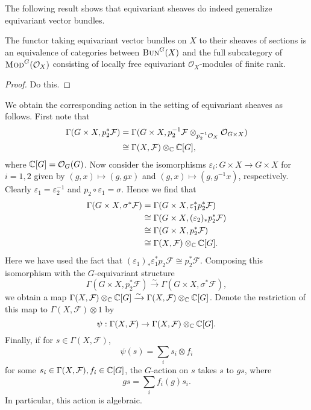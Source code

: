 The following result shows that equivariant sheaves do indeed generalize equivariant vector bundles.

\begin{proposition}
    The functor taking equivariant vector bundles on $X$ to their sheaves of sections
    is an equivalence of categories between $\textsc{Bun}^G(X)$ and the full subcategory of
    $\textsc{Mod}^G(\mathcal{O}_X)$ consisting of locally free equivariant $\mathcal{O}_X$-modules
    of finite rank.
\end{proposition}
\begin{proof}
    Do this.
\end{proof}

We obtain the corresponding action in the setting of equivariant sheaves as follows. First
note that
\begin{align*}
    \Gamma(G\times X,p_2^*\mathcal{F}) &= \Gamma(G\times X, p_2^{-1}\mathcal{F}\otimes_{p_2^{-1}\mathcal{O}_X}\mathcal{O}_{G\times X})\\
    &\cong \Gamma(X,\mathcal{F}) \otimes_{\mathbb{C}}\mathbb{C}[G],
\end{align*}
where $\mathbb{C}[G]=\mathcal{O}_G(G)$. Now consider the isomorphisms
$\varepsilon_i:G\times X\to G\times X$ for $i=1,2$ given by $(g,x)\mapsto (g,gx)$ and $(g,x)\mapsto(g,g^{-1}x)$, respectively.
Clearly $\varepsilon_1=\varepsilon_2^{-1}$ and $p_2\circ\varepsilon_1=\sigma$. Hence we find that
\begin{align*}
    \Gamma(G\times X,\sigma^*\mathcal{F}) &= \Gamma(G\times X,\varepsilon_1^*p_2^*\mathcal{F})\\
    &\cong \Gamma(G\times X,(\varepsilon_2)_*p_2^*\mathcal{F})\\
    &\cong \Gamma(G\times X,p_2^*\mathcal{F})\\
    &\cong \Gamma(X,\mathcal{F}) \otimes_{\mathbb{C}}\mathbb{C}[G].
\end{align*}
Here we have used the fact that $(\varepsilon_1)_*\varepsilon_1^*p_2\mathcal{F}\cong p_2^*\mathcal{F}$.
Composing this isomorphism with the $G$-equivariant structure
\[\Gamma(G\times X,p_2^*\mathcal{F})\xrightarrow{\sim}\Gamma(G\times X,\sigma^*\mathcal{F}),\]
we obtain a map $\Gamma(X,\mathcal{F})\otimes_{\mathbb{C}}\mathbb{C}[G]\xrightarrow{\sim}\Gamma(X,\mathcal{F})\otimes_{\mathbb{C}}\mathbb{C}[G]$.
Denote the restriction of this map to $\Gamma(X,\mathcal{F})\otimes 1$ by
\[\psi:\Gamma(X,\mathcal{F})\to\Gamma(X,\mathcal{F})\otimes_{\mathbb{C}}\mathbb{C}[G].\]
Finally, if for $s\in\Gamma(X,\mathcal{F})$,
\[\psi(s)=\sum_i s_i\otimes f_i\]
for some $s_i\in\Gamma(X,\mathcal{F}), f_i\in\mathbb{C}[G]$, the $G$-action on $s$ takes $s$ to $gs$,
where
\[gs=\sum_if_i(g)s_i.\]
In particular, this action is algebraic.


